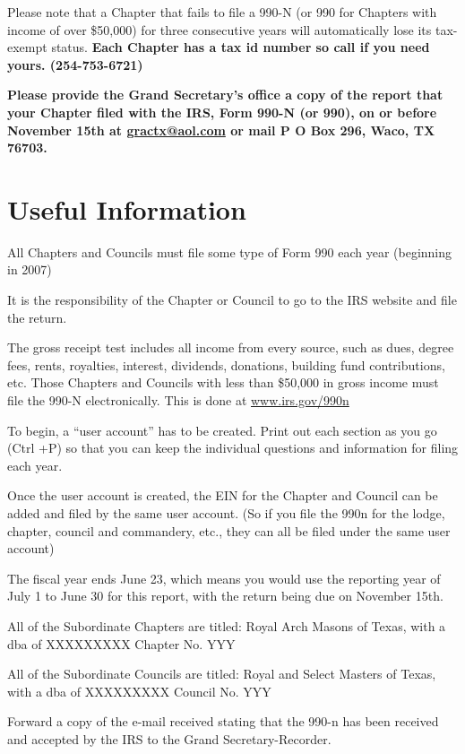 \documentclass[letterpaper]{article}
\begin{document}
	Please note that a Chapter that fails to file a 990-N (or 990 for Chapters with income of over \$50,000) for three consecutive years will automatically lose its tax-exempt status. \textbf{ Each Chapter has a tax id number so call if you need yours. (254-753-6721)}
	
	\textbf{Please provide the Grand Secretary’s office a copy of the report that your Chapter filed with the IRS, Form 990-N (or 990), on or before November 15th at \url{gractx@aol.com} or mail P O Box 296, Waco, TX 76703.} \pagebreak
	
	\section*{Useful Information}
	
	All Chapters and Councils must file some type of Form 990 each year (beginning in 2007)
	
	It is the responsibility of the Chapter or Council to go to the IRS website and file the return.
	
	The gross receipt test includes all income from every source, such as dues, degree fees, rents, royalties, interest, dividends, donations, building fund contributions, etc. Those Chapters and Councils with less than \$50,000 in gross income must file the 990-N electronically. This is done at \url{www.irs.gov/990n}
	
	To begin, a ``user account'' has to be created. Print out each section as you go (Ctrl +P) so that you can keep the individual questions and information for filing each year.
	
	Once the user account is created, the EIN for the Chapter and Council can be added and filed by the same user account. (So if you file the 990n for the lodge, chapter, council and commandery, etc., they can all be filed under the same user account)
	
	The fiscal year ends June 23, which means you would use the reporting year of July 1 to June 30 for this report, with the return being due on November 15th.
	
	All of the Subordinate Chapters are titled: Royal Arch Masons of Texas, with a dba of XXXXXXXXX Chapter No. YYY
	
	All of the Subordinate Councils are titled: Royal and Select Masters of Texas, with a dba of XXXXXXXXX Council No. YYY
	
	Forward a copy of the e-mail received stating that the 990-n has been received and accepted by the IRS to the Grand Secretary-Recorder.
	
\end{document}
